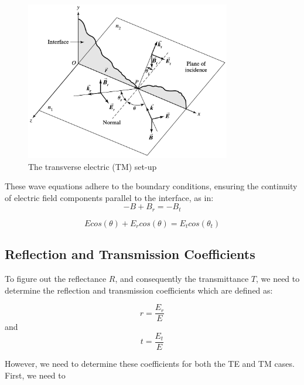 \begin{figure}
  \centering
  \includegraphics[width=0.8\textwidth]{Chapters/Figures/Incident, Relfected, and Transmitted Ray for TM Mode.jpg}
  \caption{The transverse electric (TM) set-up}
\end{figure}

These wave equations adhere to the boundary conditions, ensuring the continuity of electric field components parallel to the interface, as in:
\begin{equation} \label{Magnetic field boundary conditions for TM waves}
-B + B_r = -B_t
\end{equation}

\begin{equation} \label{Electric field boundary conditions for TM waves}
Ecos(\theta) + E_rcos(\theta) = E_tcos(\theta_t)
\end{equation}

\subsection{Reflection and Transmission Coefficients}
To figure out the reflectance $R$, and consequently the transmittance $T$, we need to determine the reflection and transmission coefficients which are defined as:

\begin{equation} \label{Definition of the reflection coefficient}
r = \frac{E_r}{E}
\end{equation}
and
\begin{equation} \label{Definition of the transmission coefficient}
t = \frac{E_t}{E}
\end{equation}

However, we need to determine these coefficients for both the TE and TM cases. First, we need to 
